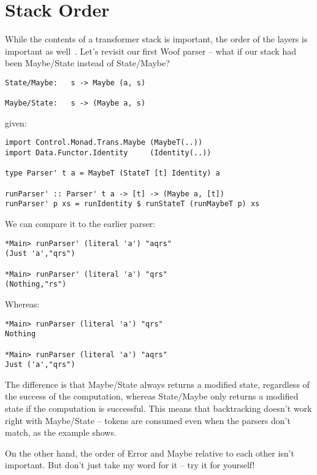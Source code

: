 \documentclass{tmr}
\begin{document}

\section{Stack Order}
While the contents of a transformer stack is important, the order of the
layers is important as well~\cite{stack}.  Let's revisit our first Woof parser -- what if our 
stack had been Maybe/State instead of State/Maybe?
\begin{verbatim}
State/Maybe:   s -> Maybe (a, s)

Maybe/State:   s -> (Maybe a, s)
\end{verbatim}

given:
\begin{verbatim}
import Control.Monad.Trans.Maybe (MaybeT(..))
import Data.Functor.Identity     (Identity(..))

type Parser' t a = MaybeT (StateT [t] Identity) a

runParser' :: Parser' t a -> [t] -> (Maybe a, [t])
runParser' p xs = runIdentity $ runStateT (runMaybeT p) xs
\end{verbatim}

We can compare it to the earlier parser:
\begin{verbatim}
*Main> runParser' (literal 'a') "aqrs"
(Just 'a',"qrs")

*Main> runParser' (literal 'a') "qrs"
(Nothing,"rs")
\end{verbatim}
Whereas:
\begin{verbatim}
*Main> runParser (literal 'a') "qrs"
Nothing

*Main> runParser (literal 'a') "aqrs"
Just ('a',"qrs")
\end{verbatim}

The difference is that Maybe/State always returns a modified state, regardless
of the success of the computation, whereas State/Maybe only returns a modified
state if the computation is successful.  This means that backtracking doesn't
work right with Maybe/State -- tokens are consumed even when the parsers
don't match, as the example shows.

On the other hand, the order of Error and Maybe relative to each other isn't 
important.  But don't just take my word for it -- try it for yourself!
\end{document}
